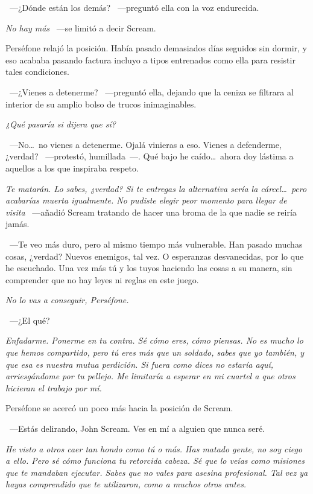 ~---¿Dónde están los demás? ~---preguntó ella con la voz endurecida.

\emph{No hay más} ~---se limitó a decir Scream.

Perséfone relajó la posición. Había pasado demasiados días seguidos sin dormir, y eso acababa pasando factura incluyo a tipos entrenados como ella para resistir tales condiciones.

~---¿Vienes a detenerme? ~---preguntó ella, dejando que la ceniza se filtrara al interior de su amplio bolso de trucos inimaginables.

\emph{¿Qué pasaría si dijera que sí?}

~---No\dots\ no vienes a detenerme. Ojalá vinieras a eso. Vienes a defenderme, ¿verdad? ~---protestó, humillada~---. Qué bajo he caído\dots\ ahora doy lástima a aquellos a los que inspiraba respeto.

\emph{Te matarán. Lo sabes, ¿verdad? Si te entregas la alternativa sería la cárcel\dots\ pero acabarías muerta igualmente. No pudiste elegir peor momento para llegar de visita} ~---añadió Scream tratando de hacer una broma de la que nadie se reiría jamás.

~---Te veo más duro, pero al mismo tiempo más vulnerable. Han pasado muchas cosas, ¿verdad? Nuevos enemigos, tal vez. O esperanzas desvanecidas, por lo que he escuchado. Una vez más tú y los tuyos haciendo las cosas a su manera, sin comprender que no hay leyes ni reglas en este juego.

\emph{No lo vas a conseguir, Perséfone.}

~---¿El qué?

\emph{Enfadarme. Ponerme en tu contra. Sé cómo eres, cómo piensas. No es mucho lo que hemos compartido, pero tú eres más que un soldado, sabes que yo también, y que esa es nuestra mutua perdición. Si fuera como dices no estaría aquí, arriesgándome por tu pellejo. Me limitaría a esperar en mi cuartel a que otros hicieran el trabajo por mí.}

Perséfone se acercó un poco más hacia la posición de Scream.

~---Estás delirando, John Scream. Ves en mí a alguien que nunca seré.

\emph{He visto a otros caer tan hondo como tú o más. Has matado gente, no soy ciego a ello. Pero sé cómo funciona tu retorcida cabeza. Sé que lo veías como misiones que te mandaban ejecutar. Sabes que no vales para asesina profesional. Tal vez ya hayas comprendido que te utilizaron, como a muchos otros antes.}


